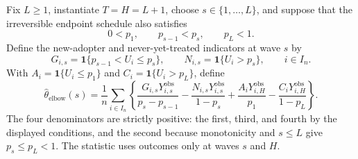 Fix \(L\geq1\), instantiate \(T=H=L+1\), choose \(s\in\{1,\ldots,L\}\), and suppose that the irreversible endpoint schedule also satisfies
\[
 0<p_1,\qquad p_{s-1}<p_s,\qquad p_L<1.
\]
Define the new-adopter and never-yet-treated indicators at wave \(s\) by
\[
 G_{i,s}=\mathbf 1\{p_{s-1}<U_i\leq p_s\},
 \qquad
 N_{i,s}=\mathbf 1\{U_i>p_s\},
 \qquad i\in I_n.
\]
With \(A_i=\mathbf 1\{U_i\leq p_1\}\) and \(C_i=\mathbf 1\{U_i>p_L\}\), define
\[
 \widehat\theta_{\mathrm{elbow}}(s)
 =\frac1n\sum_{i\in I_n}
 \left\{
 \frac{G_{i,s}Y^{\mathrm{obs}}_{i,s}}{p_s-p_{s-1}}
 -\frac{N_{i,s}Y^{\mathrm{obs}}_{i,s}}{1-p_s}
 +\frac{A_iY^{\mathrm{obs}}_{i,H}}{p_1}
 -\frac{C_iY^{\mathrm{obs}}_{i,H}}{1-p_L}
 \right\}.
\]
The four denominators are strictly positive: the first, third, and fourth by the displayed conditions, and the second because monotonicity and \(s\leq L\) give \(p_s\leq p_L<1\).  The statistic uses outcomes only at waves \(s\) and \(H\).